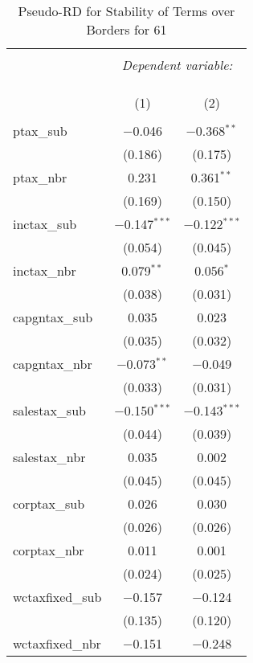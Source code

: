 
\begin{table}[!htbp] \centering 
  \caption{Pseudo-RD for Stability of Terms over Borders for  61} 
  \label{} 
\begin{tabular}{@{\extracolsep{5pt}}lcc} 
\\[-1.8ex]\hline 
\hline \\[-1.8ex] 
 & \multicolumn{2}{c}{\textit{Dependent variable:}} \\ 
\cline{2-3} 
\\[-1.8ex] & \multicolumn{2}{c}{ } \\ 
\\[-1.8ex] & (1) & (2)\\ 
\hline \\[-1.8ex] 
 ptax\_sub & $-$0.046 & $-$0.368$^{**}$ \\ 
  & (0.186) & (0.175) \\ 
  ptax\_nbr & 0.231 & 0.361$^{**}$ \\ 
  & (0.169) & (0.150) \\ 
  inctax\_sub & $-$0.147$^{***}$ & $-$0.122$^{***}$ \\ 
  & (0.054) & (0.045) \\ 
  inctax\_nbr & 0.079$^{**}$ & 0.056$^{*}$ \\ 
  & (0.038) & (0.031) \\ 
  capgntax\_sub & 0.035 & 0.023 \\ 
  & (0.035) & (0.032) \\ 
  capgntax\_nbr & $-$0.073$^{**}$ & $-$0.049 \\ 
  & (0.033) & (0.031) \\ 
  salestax\_sub & $-$0.150$^{***}$ & $-$0.143$^{***}$ \\ 
  & (0.044) & (0.039) \\ 
  salestax\_nbr & 0.035 & 0.002 \\ 
  & (0.045) & (0.045) \\ 
  corptax\_sub & 0.026 & 0.030 \\ 
  & (0.026) & (0.026) \\ 
  corptax\_nbr & 0.011 & 0.001 \\ 
  & (0.024) & (0.025) \\ 
  wctaxfixed\_sub & $-$0.157 & $-$0.124 \\ 
  & (0.135) & (0.120) \\ 
  wctaxfixed\_nbr & $-$0.151 & $-$0.248 \\ 

\end{tabular}
\end{table}
